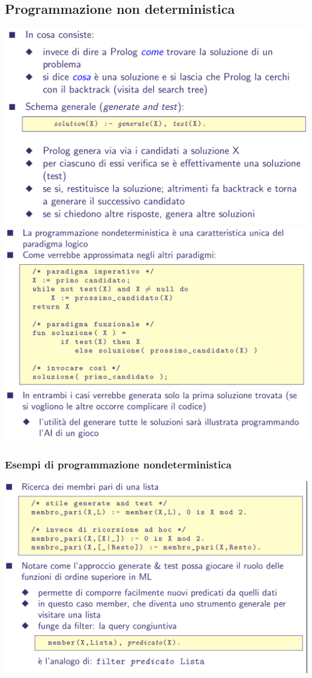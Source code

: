 \documentclass[10pt]{article}
\begin{document}
\subsection{Programmazione non deterministica}
\includegraphics[scale=0.25]{Immagini/pl40.png}
\\
\includegraphics[scale=0.25]{Immagini/pl41.png}
\subsubsection{Esempi di programmazione nondeterministica}
\includegraphics[scale=0.25]{Immagini/pl42.png}
\end{document}
